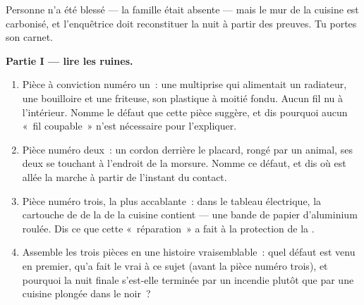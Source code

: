 \begin{problem}\label{pb:g7:short-circuits-safety:1}
Personne n'a été blessé --- la famille était absente --- mais le mur
de la cuisine est carbonisé, et l'enquêtrice doit reconstituer la
nuit à partir des preuves. Tu portes son carnet.

\medskip\noindent\textbf{Partie I --- lire les ruines.}
\begin{enumerate}
  \item Pièce à conviction numéro un~: une multiprise qui alimentait
        un radiateur, une bouilloire et une friteuse, son plastique
        à moitié fondu. Aucun fil nu à l'intérieur. Nomme le défaut
        que cette pièce suggère, et dis pourquoi aucun «~fil
        coupable~» n'est nécessaire pour l'expliquer.
  \item Pièce numéro deux~: un cordon derrière le placard, rongé
        par un animal, ses deux  se touchant à l'endroit
        de la morsure. Nomme ce défaut, et dis où est allée la
        marche à partir de l'instant du contact.
  \item Pièce numéro trois, la plus accablante~: dans le tableau
        électrique, la cartouche de  de la  de la
        cuisine contient --- une bande de papier d'aluminium
        roulée. Dis ce que cette «~réparation~» a fait à la
        protection de la .
  \item Assemble les trois pièces en une histoire vraisemblable~:
        quel défaut est venu en premier, qu'a fait le vrai 
        à ce sujet (avant la pièce numéro trois), et pourquoi la
        nuit finale s'est-elle terminée par un incendie plutôt que
        par une cuisine plongée dans le noir~?
\end{enumerate}


\end{problem}

